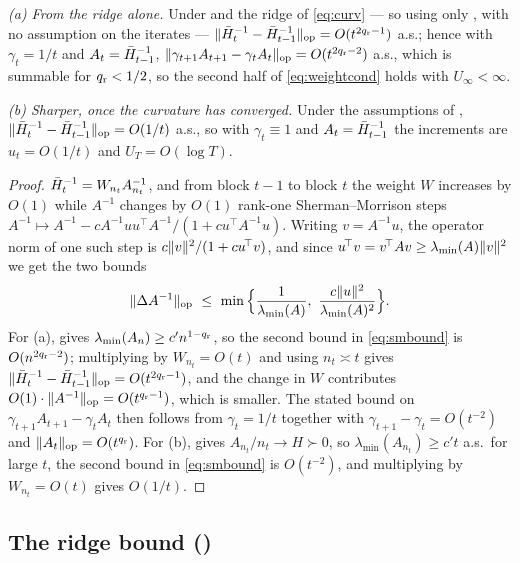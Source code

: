 \begin{lemma}
\label{lem:incr}
\emph{(a) From the ridge alone.} Under  and the ridge of \eqref{eq:curv} --- so
using only , with no assumption on the iterates ---
$\lVert \bar{H}_t^{-1}-\bar{H}_{t-1}^{-1} \rVert_{\mathrm{op}}=O(t^{2q_{\mathrm r}-1})$ a.s.; hence with $\gamma_t=1/t$ and
$A_t=\bar{H}_{t-1}^{-1}$, $\lVert \gamma_{t+1}A_{t+1}-\gamma_tA_t \rVert_{\mathrm{op}}=O(t^{2q_{\mathrm r}-2})$ a.s., which is
summable for $q_{\mathrm r}<1/2$, so the second half of \eqref{eq:weightcond} holds with
$U_\infty<\infty$.

\emph{(b) Sharper, once the curvature has converged.} Under the assumptions of
, $\lVert \bar{H}_t^{-1}-\bar{H}_{t-1}^{-1} \rVert_{\mathrm{op}}=O(1/t)$ a.s., so with $\gamma_t\equiv1$
and $A_t=\bar{H}_{t-1}^{-1}$ the increments are $u_t=O(1/t)$ and $U_T=O(\log T)$.
\end{lemma}

\begin{proof}
$\bar{H}_t^{-1}=W_{n_t}A_{n_t}^{-1}$, and from block $t-1$ to block $t$ the weight $W$ increases by
$O(1)$ while $A^{-1}$ changes by $O(1)$ rank-one Sherman--Morrison steps
$A^{-1}\mapsto A^{-1}-cA^{-1}uu^{\!\top}A^{-1}/(1+cu^{\!\top}A^{-1}u)$. Writing $v=A^{-1}u$, the
operator norm of one such step is $c\lVert v \rVert^2/(1+cu^{\!\top}v)$, and since
$u^{\!\top}v=v^{\!\top}Av\ge\lambda_{\min}(A)\lVert v \rVert^2$ we get the two bounds
\begin{equation}
\lVert \Delta A^{-1} \rVert_{\mathrm{op}}\ \le\ \min\Big\{\frac{1}{\lambda_{\min}(A)},\
\frac{c\lVert u \rVert^2}{\lambda_{\min}(A)^2}\Big\} .
\label{eq:smbound}
\end{equation}
For (a),  gives $\lambda_{\min}(A_{n})\ge c'n^{1-q_{\mathrm r}}$, so the second bound in
\eqref{eq:smbound} is $O(n^{2q_{\mathrm r}-2})$; multiplying by $W_{n_t}=O(t)$ and using $n_t\asymp t$
gives $\lVert \bar{H}_t^{-1}-\bar{H}_{t-1}^{-1} \rVert_{\mathrm{op}}=O(t^{2q_{\mathrm r}-1})$, and the change in $W$ contributes
$O(1)\cdot\lVert A^{-1} \rVert_{\mathrm{op}}=O(t^{q_{\mathrm r}-1})$, which is smaller. The stated bound on
$\gamma_{t+1}A_{t+1}-\gamma_tA_t$ then follows from $\gamma_t=1/t$ together with
$\gamma_{t+1}-\gamma_t=O(t^{-2})$ and $\lVert A_t \rVert_{\mathrm{op}}=O(t^{q_{\mathrm r}})$.
For (b), \Cref{thm:curv} gives $A_{n_t}/n_t\to H\succ0$, so $\lambda_{\min}(A_{n_t})\ge c't$
a.s.\ for large $t$, the second bound in \eqref{eq:smbound} is $O(t^{-2})$, and multiplying by
$W_{n_t}=O(t)$ gives $O(1/t)$.
\end{proof}

\subsection{The ridge bound (\texorpdfstring{}{Lemma})}

